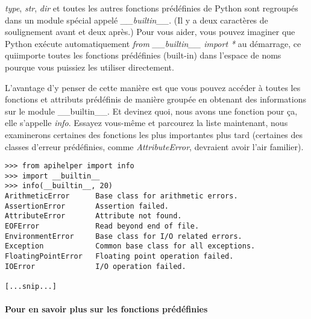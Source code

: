 \emph{type}, \emph{str}, \emph{dir} et toutes les autres fonctions prédéfinies de Python sont regroupés dans un module spécial appelé \emph{\_\_builtin\_\_}. (Il y a deux caractères de soulignement avant et deux après.) Pour vous aider, vous pouvez imaginer que Python exécute automatiquement \emph{from \_\_builtin\_\_ import *} au démarrage, ce quiimporte toutes les fonctions prédéfinies (built-in) dans l’espace de noms pourque vous puissiez les utiliser directement.

L’avantage d’y penser de cette manière est que vous pouvez accéder à toutes les fonctions et attributs prédéfinis de manière groupée en obtenant des informations sur le module \_\_builtin\_\_. Et devinez quoi, nous avons une fonction pour ça, elle s’appelle \emph{info}. Essayez vous-même et parcourez la liste maintenant, nous examinerons certaines des fonctions les plus importantes plus tard (certaines des classes d’erreur prédéfinies, comme \emph{AttributeError}, devraient avoir l’air familier).

\begin{example}
\begin{lstlisting}
>>> from apihelper import info
>>> import __builtin__
>>> info(__builtin__, 20)
ArithmeticError      Base class for arithmetic errors.
AssertionError       Assertion failed.
AttributeError       Attribute not found.
EOFError             Read beyond end of file.
EnvironmentError     Base class for I/O related errors.
Exception            Common base class for all exceptions.
FloatingPointError   Floating point operation failed.
IOError              I/O operation failed.

[...snip...]
\end{lstlisting}
\end{example}


\paragraph*{Pour en savoir plus sur les fonctions prédéfinies}

